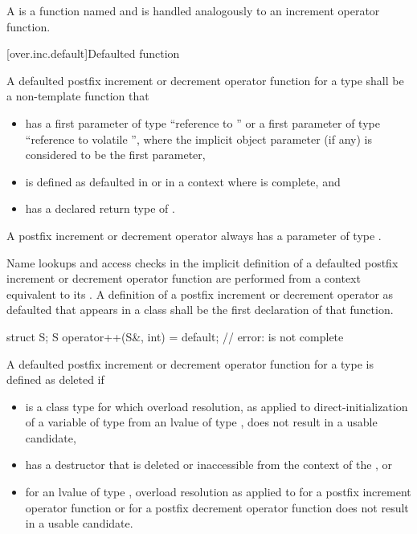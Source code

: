 \pnum
{}%
A 
is a function named 
and is handled analogously to an increment operator function.

[over.inc.default]{Defaulted function}

\pnum
A defaulted postfix increment or decrement operator function
for a type  shall be a non-template function that
\begin{itemize}
\item
has a first parameter of type ``reference to '' or
a first parameter of type ``reference to volatile '',
where the implicit object parameter (if any)
is considered to be the first parameter,
\item
is defined as defaulted in  or
in a context where  is complete, and
\item
has a declared return type of .
\end{itemize}
\begin{note}
A postfix increment or decrement operator
always has a parameter of type .
\end{note}
Name lookups and access checks
in the implicit definition of
a defaulted postfix increment or decrement operator function
are performed from a context equivalent to its .
A definition of a postfix increment or decrement operator as defaulted
that appears in a class shall be the first declaration of that function.
\begin{example}
\begin{codeblock}
struct S;
S operator++(S&, int) = default;        // error:  is not complete
\end{codeblock}
\end{example}

\pnum
A defaulted postfix increment or decrement operator function
for a type 
is defined as deleted if
\begin{itemize}
\item
{} is a class type for which overload resolution,
as applied to direct-initialization of a variable of type 
from an lvalue of type , does not result in a usable candidate,
\item
{} has a destructor that is deleted or inaccessible
from the context of the , or
\item
for an lvalue  of type ,
overload resolution as applied to
 for a postfix increment operator function or
 for a postfix decrement operator function
does not result in a usable candidate.
\end{itemize}

